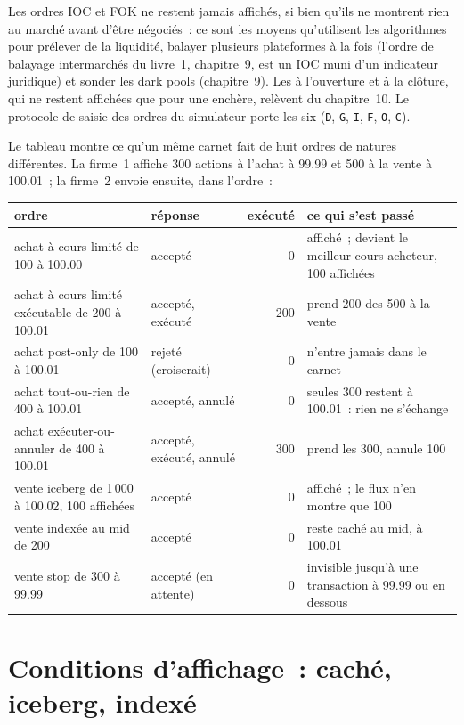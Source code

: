 Les ordres IOC et FOK ne restent jamais affichés, si bien qu'ils ne montrent rien au marché avant d'être négociés~: ce sont les moyens qu'utilisent les algorithmes pour prélever de la liquidité, balayer plusieurs
plateformes à la fois (l'ordre de balayage intermarchés du livre~1, chapitre~9, est un IOC muni d'un indicateur juridique) et sonder les dark pools (chapitre~9). Les  à l'ouverture
et à la clôture, qui ne restent affichées que pour une enchère, relèvent du chapitre~10. Le protocole de saisie des ordres du simulateur porte les six
(\texttt{D}, \texttt{G}, \texttt{I}, \texttt{F}, \texttt{O}, \texttt{C}).

Le tableau montre ce qu'un même carnet fait de huit ordres de natures différentes. La firme~1 affiche 300 actions à l'achat à 99.99 et 500 à la vente à 100.01~; la firme~2 envoie ensuite,
dans l'ordre~:

\begin{center}
\small
\begin{tabular}{@{}p{4.4cm}p{3.2cm}rp{4.6cm}@{}}
\toprule
ordre & réponse & exécuté & ce qui s'est passé \\
\midrule
achat à cours limité de 100 à 100.00 & accepté & 0 & affiché~; devient le meilleur cours acheteur, 100 affichées \\
achat à cours limité exécutable de 200 à 100.01 & accepté, exécuté & 200 & prend 200 des 500 à la vente \\
achat post-only de 100 à 100.01 & rejeté (croiserait) & 0 & n'entre jamais dans le carnet \\
achat tout-ou-rien de 400 à 100.01 & accepté, annulé & 0 & seules 300 restent à 100.01~: rien ne s'échange \\
achat exécuter-ou-annuler de 400 à 100.01 & accepté, exécuté, annulé & 300 & prend les 300, annule 100 \\
vente iceberg de 1\,000 à 100.02, 100 affichées & accepté & 0 & affiché~; le flux n'en montre que 100 \\
vente indexée au mid de 200 & accepté & 0 & reste caché au mid, à 100.01 \\
vente stop de 300 à 99.99 & accepté (en attente) & 0 & invisible jusqu'à une transaction à 99.99 ou en dessous \\
\bottomrule
\end{tabular}
\end{center}

\section{Conditions d'affichage~: caché, iceberg, indexé}

